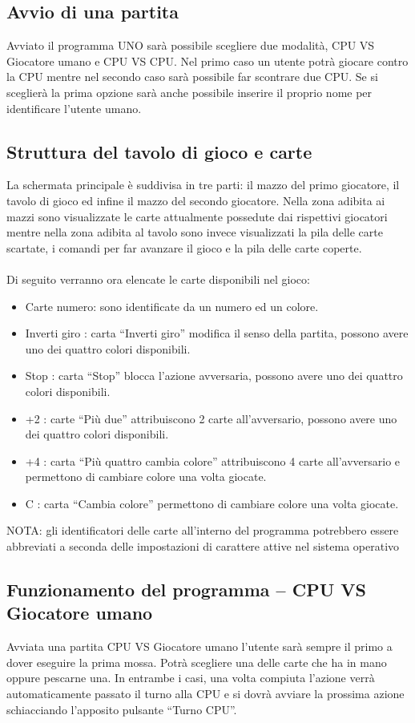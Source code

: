 	\subsection{Avvio di una partita}
		Avviato il programma UNO sarà possibile scegliere due modalità, CPU VS Giocatore umano e CPU VS CPU. Nel primo caso un utente potrà giocare contro la CPU mentre nel secondo caso sarà possibile far scontrare due CPU. 
		Se si sceglierà la prima opzione sarà anche possibile inserire il proprio nome per identificare l’utente umano.
	
	\subsection{Struttura del tavolo di gioco e carte}
		La schermata principale è suddivisa in tre parti: il mazzo del primo giocatore, il tavolo di gioco ed infine il mazzo del secondo giocatore. Nella zona adibita ai mazzi sono visualizzate le carte attualmente possedute dai rispettivi giocatori mentre nella zona adibita al tavolo sono invece visualizzati la pila delle carte scartate, i comandi per far avanzare il gioco e la pila delle carte coperte.\\\\
		
		Di seguito verranno ora elencate le carte disponibili nel gioco:
		\begin{itemize}
			\item Carte numero: sono identificate da un numero ed un colore.
			\item Inverti giro  : carta ``Inverti giro'' modifica il senso della partita, possono avere uno dei quattro colori disponibili.
			\item Stop : carta ``Stop'' blocca l'azione avversaria, possono avere uno dei quattro colori disponibili.
			\item +2 : carte ``Più due'' attribuiscono 2 carte all'avversario, possono avere uno dei quattro colori disponibili.
			\item +4 : carta ``Più quattro cambia colore'' attribuiscono 4 carte all’avversario e  permettono di cambiare colore una volta giocate.
			\item C : carta ``Cambia colore'' permettono di cambiare colore una volta giocate.
		\end{itemize}
		NOTA: gli identificatori delle carte all’interno del programma potrebbero essere abbreviati a seconda delle impostazioni di carattere  attive nel sistema operativo
		
	\subsection{Funzionamento del programma – CPU VS Giocatore umano}
		Avviata una partita CPU VS Giocatore umano l’utente sarà sempre il primo a dover eseguire la prima mossa. Potrà scegliere una delle carte che ha in mano oppure pescarne una. In entrambe i casi, una volta compiuta l’azione verrà automaticamente passato il turno alla CPU e si dovrà avviare la prossima azione schiacciando l’apposito pulsante “Turno CPU”.\\\\
		
